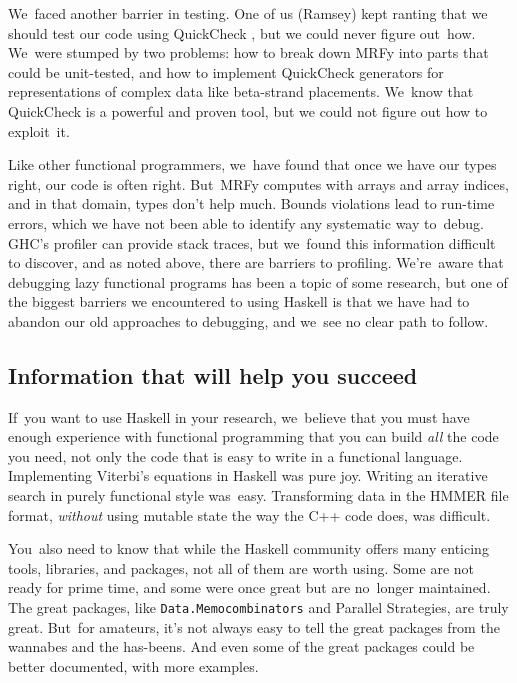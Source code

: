 \documentclass[preprint,nonatbib,blockstyle,nocopyrightspace,times]{sigplanconf}
\newcommand\seclabel[1]{\label{sec:#1}}
\newcommand\finalremark{\remark}
\newcommand\finalremark[1]{\relax}
\let\cite\citep
\begin{document}
We~faced another barrier in testing.
One of us (Ramsey) kept ranting that we should test our code using 
QuickCheck \cite{claessen:quickcheck},
but we could never figure out~how.
We~were stumped by two problems:
how to break down MRFy into parts that could be
unit-tested,
and how to implement QuickCheck generators for representations of complex
data like beta-strand placements.
We~know that QuickCheck is a powerful and proven tool,
but we could not figure out how to exploit~it.

Like other functional programmers, we~have found that 
once we have our types right, our code is often right.
But~MRFy computes with arrays and array indices,
and in that domain, types don't help much.
Bounds violations lead to run-time errors, which we have not been able
to identify any systematic way to~debug.
GHC's profiler can provide stack traces, but we~found this information
difficult to discover, and as noted above,
there are barriers to profiling.
We're~aware that debugging lazy functional programs has been a topic
of some research,\finalremark{Do we cite Hood, Hat, or Freya?}
but one of the biggest barriers we encountered to using Haskell is
that we have had to abandon our old approaches to debugging,
and we~see no clear path to follow.


\subsection{Information that will help you succeed}

If~you want to use Haskell in your research, we~believe that you must
have enough experience with functional programming that you can build
\emph{all} the code you need, not only the code that is easy to write
in a functional language.
Implementing Viterbi's equations in Haskell was pure joy.
Writing an iterative search in purely functional style was~easy.
Transforming data in the HMMER file format, \emph{without}
using mutable state the way the C++ code does, was difficult.

\seclabel{penumbra}

You~also need to know that while the Haskell community offers many
enticing tools, libraries, and packages,
not all of them are worth using.
Some are not ready for prime time, and some were once great but are
no~longer maintained.
The great packages, like \texttt{Data.Memocombinators} and Parallel
Strategies, are truly great.
But~for amateurs, it's not always easy to tell the great packages from the wannabes
and the has-beens.
And even some of the great packages could be better documented, with
more examples.
\end{document}
